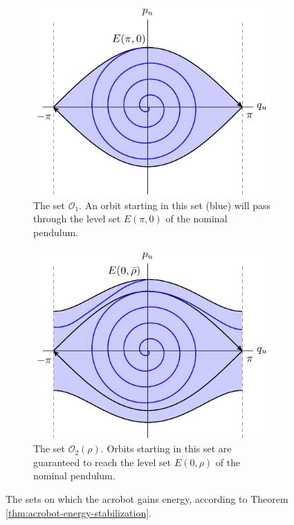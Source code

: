 \documentclass[journal,twoside,web, onecolumn, draftcls]{ieeecolor}
\begin{document}
\begin{figure}
    \centering
    \begin{subfigure}[t]{0.45\linewidth}
        \includegraphics[width=\linewidth]{acrobot_oscillation_domain.pdf}
        \caption{The set \(\mathcal{O}_1\). An orbit starting in this set (blue)
            will pass through the level set \(E(\pi,0)\) of the nominal pendulum.}
        \label{fig:acrobot-oscillation-domain}
    \end{subfigure}
    \hfill
    \begin{subfigure}[t]{0.45\linewidth}
        \includegraphics[width=\linewidth]{acrobot_omega.pdf}
        \caption{The set \(\mathcal{O}_2(\rho)\). Orbits starting in this
            set are guaranteed to reach the level set \(E(0,\rho)\) of the
            nominal pendulum.}
            \label{fig:acrobot-o2}
    \end{subfigure}
    \caption{The sets on which the acrobot gains energy, according to
        Theorem \ref{thm:acrobot-energy-stabilization}.}
\end{figure}
\end{document}
